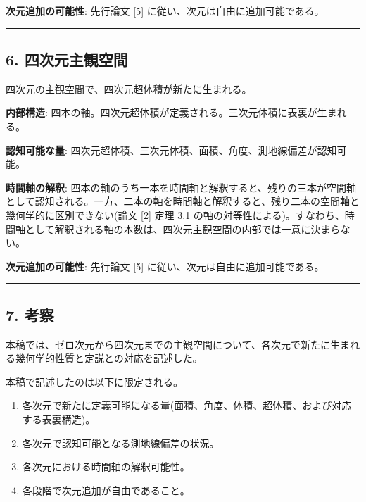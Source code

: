 \documentclass[a4paper,11pt]{ltjsarticle}
\theoremstyle{definition}
\providecommand{\tightlist}{\setlength{\itemsep}{0pt}\setlength{\parskip}{0pt}}
\begin{document}
\textbf{次元追加の可能性}: 先行論文 {[}5{]} に従い、次元は自由に追加可能である。

\begin{center}\rule{0.5\linewidth}{0.5pt}\end{center}

\subsection{6. 四次元主観空間}\label{ux56dbux6b21ux5143ux4e3bux89b3ux7a7aux9593}

四次元の主観空間で、四次元超体積が新たに生まれる。

\textbf{内部構造}: 四本の軸。四次元超体積が定義される。三次元体積に表裏が生まれる。

\textbf{認知可能な量}: 四次元超体積、三次元体積、面積、角度、測地線偏差が認知可能。

\textbf{時間軸の解釈}: 四本の軸のうち一本を時間軸と解釈すると、残りの三本が空間軸として認知される。一方、二本の軸を時間軸と解釈すると、残り二本の空間軸と幾何学的に区別できない(論文 {[}2{]} 定理 3.1 の軸の対等性による)。すなわち、時間軸として解釈される軸の本数は、四次元主観空間の内部では一意に決まらない。

\textbf{次元追加の可能性}: 先行論文 {[}5{]} に従い、次元は自由に追加可能である。

\begin{center}\rule{0.5\linewidth}{0.5pt}\end{center}

\subsection{7. 考察}\label{ux8003ux5bdf}

本稿では、ゼロ次元から四次元までの主観空間について、各次元で新たに生まれる幾何学的性質と定説との対応を記述した。

本稿で記述したのは以下に限定される。

\begin{enumerate}
\def\labelenumi{\arabic{enumi}.}
\tightlist
\item
  各次元で新たに定義可能になる量(面積、角度、体積、超体積、および対応する表裏構造)。
\item
  各次元で認知可能となる測地線偏差の状況。
\item
  各次元における時間軸の解釈可能性。
\item
  各段階で次元追加が自由であること。
\end{enumerate}
\end{document}
